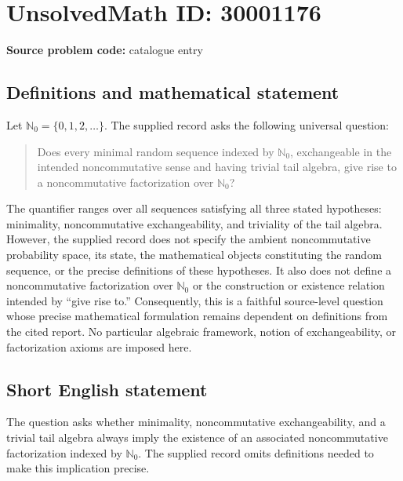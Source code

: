 \documentclass[11pt]{article}
\begin{document}
\section*{UnsolvedMath ID: 30001176}
\textbf{Source problem code:} catalogue entry
\subsection{Definitions and mathematical statement}
Let \(\mathbb N_0=\{0,1,2,\ldots\}\). The supplied record asks the following universal question:
\begin{quote}
Does every minimal random sequence indexed by \(\mathbb N_0\), exchangeable in the intended noncommutative sense and having trivial tail algebra, give rise to a noncommutative factorization over \(\mathbb N_0\)?
\end{quote}
The quantifier ranges over all sequences satisfying all three stated hypotheses: minimality, noncommutative exchangeability, and triviality of the tail algebra. However, the supplied record does not specify the ambient noncommutative probability space, its state, the mathematical objects constituting the random sequence, or the precise definitions of these hypotheses. It also does not define a noncommutative factorization over \(\mathbb N_0\) or the construction or existence relation intended by ``give rise to.'' Consequently, this is a faithful source-level question whose precise mathematical formulation remains dependent on definitions from the cited report. No particular algebraic framework, notion of exchangeability, or factorization axioms are imposed here.
\subsection{Short English statement}
The question asks whether minimality, noncommutative exchangeability, and a trivial tail algebra always imply the existence of an associated noncommutative factorization indexed by \(\mathbb N_0\). The supplied record omits definitions needed to make this implication precise.
\end{document}
